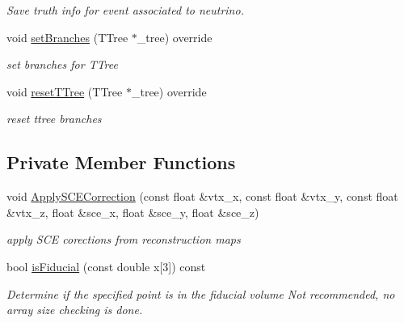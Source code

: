 \begin{DoxyCompactItemize}
\begin{DoxyCompactList}\small\item\em Save truth info for event associated to neutrino. \end{DoxyCompactList}\item 
\hypertarget{classanalysis_1_1DefaultAnalysis_a95b4abd17b0d77b436f5f6ae43e641c7}{void \hyperlink{classanalysis_1_1DefaultAnalysis_a95b4abd17b0d77b436f5f6ae43e641c7}{set\-Branches} (T\-Tree $\ast$\-\_\-tree) override}\label{classanalysis_1_1DefaultAnalysis_a95b4abd17b0d77b436f5f6ae43e641c7}

\begin{DoxyCompactList}\small\item\em set branches for T\-Tree \end{DoxyCompactList}\item 
\hypertarget{classanalysis_1_1DefaultAnalysis_a732ca63923ff91a3928dc437c2e04adf}{void \hyperlink{classanalysis_1_1DefaultAnalysis_a732ca63923ff91a3928dc437c2e04adf}{reset\-T\-Tree} (T\-Tree $\ast$\-\_\-tree) override}\label{classanalysis_1_1DefaultAnalysis_a732ca63923ff91a3928dc437c2e04adf}

\begin{DoxyCompactList}\small\item\em reset ttree branches \end{DoxyCompactList}\end{DoxyCompactItemize}
\subsection*{Private Member Functions}
\begin{DoxyCompactItemize}
\item 
\hypertarget{classanalysis_1_1DefaultAnalysis_a248e4a44368e7c8a632242fa7e171ade}{void \hyperlink{classanalysis_1_1DefaultAnalysis_a248e4a44368e7c8a632242fa7e171ade}{Apply\-S\-C\-E\-Correction} (const float \&vtx\-\_\-x, const float \&vtx\-\_\-y, const float \&vtx\-\_\-z, float \&sce\-\_\-x, float \&sce\-\_\-y, float \&sce\-\_\-z)}\label{classanalysis_1_1DefaultAnalysis_a248e4a44368e7c8a632242fa7e171ade}

\begin{DoxyCompactList}\small\item\em apply S\-C\-E corections from reconstruction maps \end{DoxyCompactList}\item 
bool \hyperlink{classanalysis_1_1DefaultAnalysis_a51efe899f0117f479c9f833663c7111f}{is\-Fiducial} (const double x\mbox{[}3\mbox{]}) const 
\begin{DoxyCompactList}\small\item\em Determine if the specified point is in the fiducial volume Not recommended, no array size checking is done. \end{DoxyCompactList}\end{DoxyCompactItemize}
